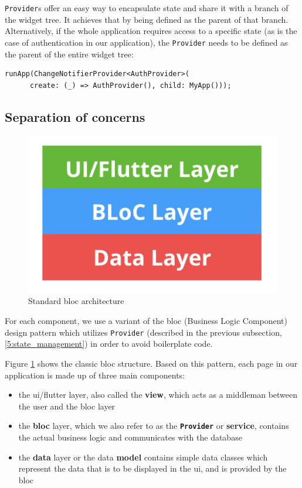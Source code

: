 \texttt{Provider}s offer an easy way to encapsulate state and share it with a branch of the widget tree. It achieves that by being defined as the parent of that branch. Alternatively, if the whole application requires access to a specific state (as is the case of authentication in our application), the \texttt{Provider} needs to be defined as the parent of the entire widget tree:

\begin{verbatim}
runApp(ChangeNotifierProvider<AuthProvider>(
      create: (_) => AuthProvider(), child: MyApp()));
\end{verbatim}

\subsection{Separation of concerns} \label{5:separation}

\begin{figure}
    \centering
    \includegraphics[width=.25\columnwidth]{figures/bloc.png}
    \caption{Standard \gls{bloc} architecture}
    \label{5:fig:bloc}
\end{figure}

For each component, we use a variant of the \gls{bloc} (Business Logic Component) design pattern which utilizes \texttt{Provider} (described in the previous subsection, \ref{5:state_management}) in order to avoid boilerplate code.

Figure \ref{5:fig:bloc} shows the classic \gls{bloc} structure. Based on this pattern, each page in our application is made up of three main components:
\begin{itemize}
    \setlength{\topsep}{0.5pt}
    \setlength{\itemsep}{0.5pt}
    \setlength{\parsep}{0.5pt}
    \item the \acrshort{ui}/\gls{flutter} layer, also called the \textbf{view}, which acts as a middleman between the user and the \gls{bloc} layer
    \item the \textbf{\gls{bloc}} layer, which we also refer to as the \textbf{\texttt{Provider}} or \textbf{service}, contains the actual business logic and communicates with the database
    \item the \textbf{data} layer or the data \textbf{model} contains simple data classes which represent the data that is to be displayed in the \acrshort{ui}, and is provided by the \gls{bloc}
\end{itemize}

